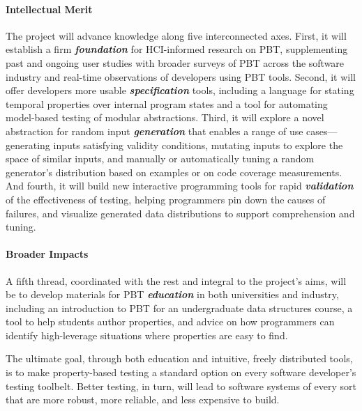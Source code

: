 \paragraph*{Intellectual Merit}
The project will advance knowledge along five interconnected axes.
%
First, it will establish a firm {\bf\em foundation} for HCI-informed
research on PBT, supplementing past and ongoing user studies with
broader surveys of PBT across the software industry and real-time
observations of developers using PBT tools.
%
Second, it will offer developers more usable {\bf\em specification} tools,
including a language for stating temporal properties over internal
program states and a tool for automating model-based testing of
modular abstractions.
%
Third, it will explore a novel abstraction for random input {\bf\em
  generation} that enables a range of use cases---generating inputs
satisfying validity conditions, mutating inputs to explore the space
of similar inputs, and manually or automatically tuning a random
generator's distribution based on examples or on code coverage
measurements.
%
And fourth, it will build new interactive programming tools for rapid
{\bf\em validation} of the effectiveness of testing, helping programmers
pin down the causes of failures, and visualize generated data
distributions to support comprehension and tuning.


\paragraph*{Broader Impacts}
A fifth thread, coordinated with the rest and integral to the
project's aims, will be to develop materials for PBT {\bf\em education}
in both universities and industry, including an introduction to PBT for
an undergraduate data structures course, a tool to help students
author properties, and advice on how programmers can identify
high-leverage situations where properties are easy to find.

The ultimate goal, through both education and intuitive, freely
distributed tools, is to make property-based testing a standard option
on every software developer's testing toolbelt.  Better testing, in
turn, will lead to software systems of every sort that are more
robust, more reliable, and less expensive to build.


